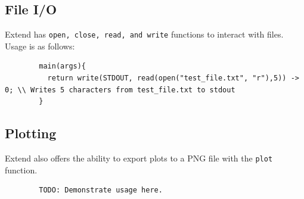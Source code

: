 	\subsection{File I/O}
	Extend has \texttt{open, close, read, and write} functions to interact with files. Usage is as follows:

	\begin{lstlisting}
		main(args){
		  return write(STDOUT, read(open("test_file.txt", "r"),5)) -> 0; \\ Writes 5 characters from test_file.txt to stdout
		}
	\end{lstlisting}

	\subsection{Plotting}
	Extend also offers the ability to export plots to a PNG file with the \texttt{plot} function.

	\begin{lstlisting}
		TODO: Demonstrate usage here.
	\end{lstlisting}

